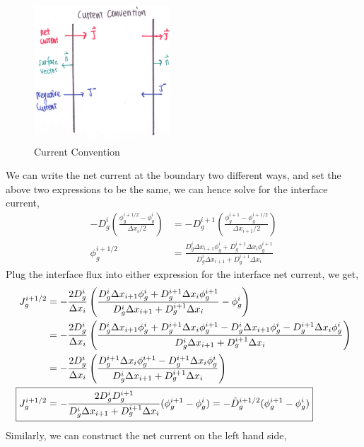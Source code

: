 \documentclass{school-22.211-notes}
\begin{document}
\clearpage
{}
\begin{figure}[ht]
  \centering
  \includegraphics[height=2in]{images/dfs/current-sign.png}
  \caption{Current Convention}
\end{figure}
We can write the net current at the boundary two different ways, 
and set the above two expressions to be the same, we can hence solve for the interface current, 
\begin{align}
 -D_g^i \left( \frac{\phi_g^{i+1/2} - \phi_g^i}{\Delta x_i /2} \right) & =  -D_g^{i+1} \left( \frac{\phi_g^{i+1} - \phi_g^{i+1/2}}{\Delta x_{i+1} /2} \right) \\
\phi_g^{i+1/2} &= \frac{D_g^i \Delta x_{i+1} \phi_g^i + D_g^{i+1} \Delta x_i \phi_g^{i+1}}{D_g^i \Delta x_{i+1} + D_g^{i+1} \Delta x_i} 
\end{align}
Plug the interface flux into either expression for the interface net current, we get, 
\begin{align}
 J_g^{i+1/2} &= - \frac{2D_g^i}{\Delta x_i} \left( \frac{D_g^i \Delta x_{i+1} \phi_g^i + D_g^{i+1} \Delta x_i \phi_g^{i+1}}{D_g^i \Delta x_{i+1} + D_g^{i+1} \Delta x_i}  - \phi_g^i \right) \\
&= - \frac{2D_g^i}{\Delta x_i} \left( \frac{D_g^i \Delta x_{i+1} \phi_g^i + D_g^{i+1} \Delta x_i \phi_g^{i+1} - D_g^i \Delta x_{i+1} \phi_g^i - D_g^{i+1} \Delta x_i \phi_g^i }{D_g^i \Delta x_{i+1} + D_g^{i+1} \Delta x_i} \right) \\
&= - \frac{2D_g^i}{\Delta x_i} \left( \frac{D_g^{i+1} \Delta x_i \phi_g^{i+1} - D_g^{i+1} \Delta x_i \phi_g^i }{D_g^i \Delta x_{i+1} + D_g^{i+1} \Delta x_i} \right) \\
\Aboxed{ J_g^{i+1/2} &= - \frac{2D_g^i D_g^{i+1}}{D_g^i \Delta x_{i+1} + D_g^{i+1} \Delta x_i} (\phi_g^{i+1} - \phi_g^i) = - \tilde{D}_g^{i+1/2} (\phi_g^{i+1} - \phi_g^i) }
\end{align}
Similarly, we can construct the net current on the left hand side, 
\end{document}
